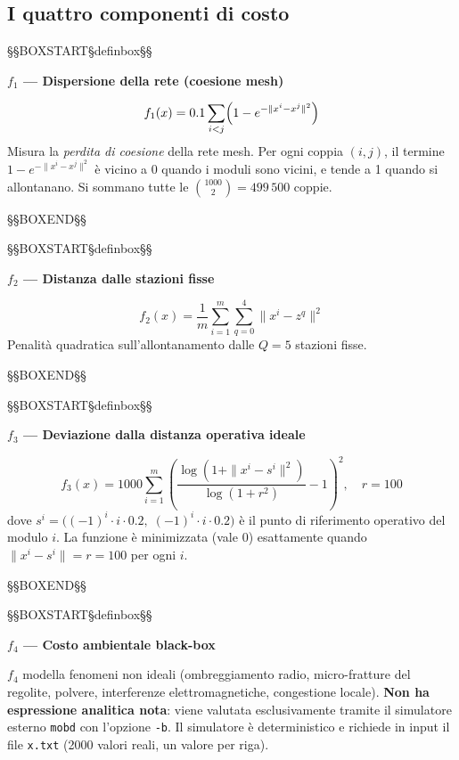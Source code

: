\documentclass[12pt,a4paper]{article}
\theoremstyle{definition}
\begin{document}
\subsection{I quattro componenti di costo}



\noindent §§BOXSTART§definbox§§

\textbf{$f_1$ — Dispersione della rete (coesione mesh)}


\[
  f_1(x) = 0.1 \sum_{i < j} \Bigl(1 - e^{-\|x^i - x^j\|^2}\Bigr)
\]
Misura la \emph{perdita di coesione} della rete mesh.
Per ogni coppia $(i,j)$, il termine $1 - e^{-\|x^i-x^j\|^2}$ è vicino a 0 quando i moduli sono
vicini, e tende a 1 quando si allontanano. Si sommano tutte le $\binom{1000}{2} = 499\,500$ coppie.


\noindent §§BOXEND§§





\noindent §§BOXSTART§definbox§§

\textbf{$f_2$ — Distanza dalle stazioni fisse}


\[
  f_2(x) = \frac{1}{m} \sum_{i=1}^{m} \sum_{q=0}^{4} \|x^i - z^q\|^2
\]
Penalità quadratica sull'allontanamento dalle $Q=5$ stazioni fisse.


\noindent §§BOXEND§§





\noindent §§BOXSTART§definbox§§

\textbf{$f_3$ — Deviazione dalla distanza operativa ideale}


\[
  f_3(x) = 1000 \sum_{i=1}^{m}
  \left(\frac{\log(1 + \|x^i - s^i\|^2)}{\log(1+r^2)} - 1\right)^2,
  \quad r = 100
\]
dove $s^i = \bigl((-1)^i \cdot i \cdot 0.2,\; (-1)^i \cdot i \cdot 0.2\bigr)$ è il punto di
riferimento operativo del modulo $i$.
La funzione è minimizzata (vale 0) esattamente quando $\|x^i - s^i\| = r = 100$ per ogni $i$.


\noindent §§BOXEND§§





\noindent §§BOXSTART§definbox§§

\textbf{$f_4$ — Costo ambientale black-box}


$f_4$ modella fenomeni non ideali (ombreggiamento radio, micro-fratture del regolite, polvere,
interferenze elettromagnetiche, congestione locale).
\textbf{Non ha espressione analitica nota}: viene valutata esclusivamente tramite il simulatore
esterno \texttt{mobd} con l'opzione \texttt{-b}.
Il simulatore è deterministico e richiede in input il file \texttt{x.txt} (2000 valori reali,
un valore per riga).
\end{document}
